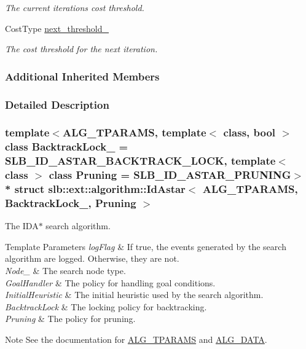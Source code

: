 \begin{DoxyCompactItemize}
\begin{DoxyCompactList}\small\item\em The current iteration\textquotesingle{}s cost threshold. \end{DoxyCompactList}\item 
Cost\+Type \hyperlink{structslb_1_1ext_1_1algorithm_1_1IdAstar_a97ed16a300231a6df5505436f47c844a}{next\+\_\+threshold\+\_\+}\hypertarget{structslb_1_1ext_1_1algorithm_1_1IdAstar_a97ed16a300231a6df5505436f47c844a}{}\label{structslb_1_1ext_1_1algorithm_1_1IdAstar_a97ed16a300231a6df5505436f47c844a}

\begin{DoxyCompactList}\small\item\em The cost threshold for the next iteration. \end{DoxyCompactList}\end{DoxyCompactItemize}
\subsubsection*{Additional Inherited Members}


\subsubsection{Detailed Description}
\subsubsection*{template$<$A\+L\+G\+\_\+\+T\+P\+A\+R\+A\+MS, template$<$ class, bool $>$ class Backtrack\+Lock\+\_\+ = S\+L\+B\+\_\+\+I\+D\+\_\+\+A\+S\+T\+A\+R\+\_\+\+B\+A\+C\+K\+T\+R\+A\+C\+K\+\_\+\+L\+O\+CK, template$<$ class $>$ class Pruning = S\+L\+B\+\_\+\+I\+D\+\_\+\+A\+S\+T\+A\+R\+\_\+\+P\+R\+U\+N\+I\+NG$>$\\*
struct slb\+::ext\+::algorithm\+::\+Id\+Astar$<$ A\+L\+G\+\_\+\+T\+P\+A\+R\+A\+M\+S, Backtrack\+Lock\+\_\+, Pruning $>$}

The {\ttfamily I\+D\+A$\ast$} search algorithm. 


\begin{DoxyTemplParams}{Template Parameters}
{\em log\+Flag} & If {\ttfamily true}, the events generated by the search algorithm are logged. Otherwise, they are not. \\
\hline
{\em Node\+\_\+} & The search node type. \\
\hline
{\em Goal\+Handler} & The policy for handling goal conditions. \\
\hline
{\em Initial\+Heuristic} & The initial heuristic used by the search algorithm. \\
\hline
{\em Backtrack\+Lock} & The locking policy for backtracking. \\
\hline
{\em Pruning} & The policy for pruning. \\
\hline
\end{DoxyTemplParams}
\begin{DoxyNote}{Note}
See the documentation for \hyperlink{algorithm_8h_a521ad67aee0e10fb76ee132a9d5c0768}{A\+L\+G\+\_\+\+T\+P\+A\+R\+A\+MS} and \hyperlink{algorithm_8h_a64c012078deee9a30405e18ec11e6360}{A\+L\+G\+\_\+\+D\+A\+TA}. 
\end{DoxyNote}


